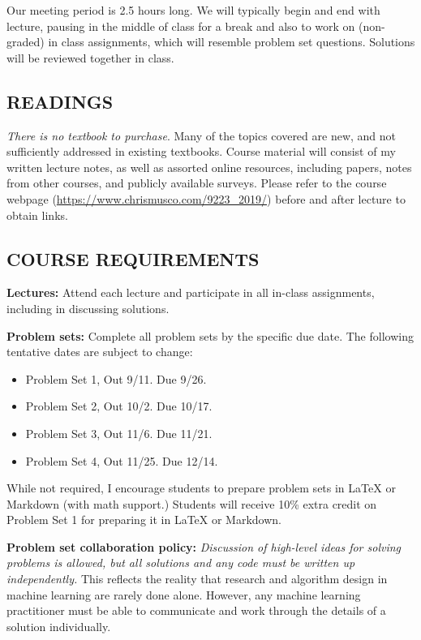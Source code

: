 \documentclass[10pt]{article}
\begin{document}
\medskip\noindent Our meeting period is  2.5 hours long. We will typically begin and end with lecture, pausing in the middle of class for a break and also to work on (non-graded) in class assignments, which will resemble problem set questions. Solutions will be reviewed together in class. 

\subsection{READINGS}
\textit{There is no textbook to purchase}. Many of the topics covered are new, and not sufficiently addressed in existing textbooks. Course material will consist of my written lecture notes, as well as assorted online resources, including papers, notes from other courses, and publicly available surveys. Please refer to the course webpage (\url{https://www.chrismusco.com/9223_2019/}) before and after lecture to obtain links.


\subsection{COURSE REQUIREMENTS}
\medskip\noindent\textbf{Lectures:} Attend each lecture and participate in all in-class assignments, including in discussing solutions.

\medskip\noindent\textbf{Problem sets:} Complete all problem sets by the specific due date. The following tentative dates are subject to change:
\begin{itemize}\itemsep0em 
	\item Problem Set 1, Out 9/11. Due 9/26.
	\item Problem Set 2, Out 10/2. Due 10/17.
	\item Problem Set 3, Out 11/6. Due 11/21.
	\item Problem Set 4, Out 11/25. Due 12/14.
\end{itemize}

\noindent While not required, I encourage students to prepare problem sets in LaTeX or Markdown (with math support.) Students will receive 10\% extra credit on Problem Set 1 for preparing it in LaTeX or Markdown.

\medskip\noindent\textbf{Problem set collaboration policy:} \textit{Discussion of high-level ideas for solving problems is allowed, but all solutions and any code must be written up independently.} This reflects the reality that research and algorithm design in machine learning are rarely done alone. However, any machine learning practitioner must be able to communicate and work through the details of a solution individually.
\end{document}
